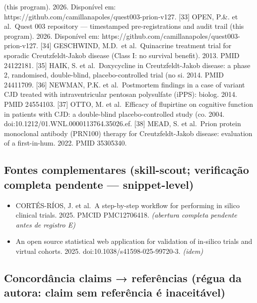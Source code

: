 \documentclass[
  12pt,
]{report}
\providecommand{\tightlist}{%
  \setlength{\itemsep}{0pt}\setlength{\parskip}{0pt}}
\begin{document}
(this program). 2026. Disponível em:
https://github.com/camillanapoles/quest003-prion-v127. {[}33{]} OPEN,
P.\&. et al.~Quest 003 repository --- timestamped pre-registrations and
audit trail (this program). 2026. Disponível em:
https://github.com/camillanapoles/quest003-prion-v127. {[}34{]}
GESCHWIND, M.D.~et al.~Quinacrine treatment trial for sporadic
Creutzfeldt-Jakob disease (Class I: no survival benefit). 2013. PMID
24122181. {[}35{]} HAIK, S. et al.~Doxycycline in Creutzfeldt-Jakob
disease: a phase 2, randomised, double-blind, placebo-controlled trial
(no si. 2014. PMID 24411709. {[}36{]} NEWMAN, P.K. et al.~Postmortem
findings in a case of variant CJD treated with intraventricular pentosan
polysulfate (iPPS): biolog. 2014. PMID 24554103. {[}37{]} OTTO, M. et
al.~Efficacy of flupirtine on cognitive function in patients with CJD: a
double-blind placebo-controlled study (co. 2004.
doi:10.1212/01.WNL.0000113764.35026.ef. {[}38{]} MEAD, S. et al.~Prion
protein monoclonal antibody (PRN100) therapy for Creutzfeldt-Jakob
disease: evaluation of a first-in-hum. 2022. PMID 35305340.

\hypertarget{fontes-complementares-skill-scout-verificauxe7uxe3o-completa-pendente-snippet-level}{%
\subsection{Fontes complementares (skill-scout; verificação completa
pendente ---
snippet-level)}\label{fontes-complementares-skill-scout-verificauxe7uxe3o-completa-pendente-snippet-level}}

\begin{itemize}
\tightlist
\item
  CORTÉS-RÍOS, J. et al.~A step-by-step workflow for performing in
  silico clinical trials. 2025. PMCID PMC12706418. \emph{(abertura
  completa pendente antes de registro E)}
\item
  An open source statistical web application for validation of in-silico
  trials and virtual cohorts. 2025. doi:10.1038/s41598-025-99720-3.
  \emph{(idem)}
\end{itemize}

\hypertarget{concorduxe2ncia-claims-referuxeancias-ruxe9gua-da-autora-claim-sem-referuxeancia-uxe9-inaceituxe1vel}{%
\subsection{Concordância claims → referências (régua da autora: claim
sem referência é
inaceitável)}\label{concorduxe2ncia-claims-referuxeancias-ruxe9gua-da-autora-claim-sem-referuxeancia-uxe9-inaceituxe1vel}}
\end{document}
